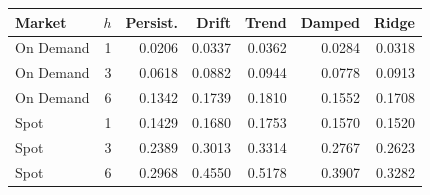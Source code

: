 \begin{tabular}{lrrrrrr}
\toprule
Market & $h$ & Persist. & Drift & Trend & Damped & Ridge \\
\midrule
On Demand & 1 & 0.0206 & 0.0337 & 0.0362 & 0.0284 & 0.0318 \\
On Demand & 3 & 0.0618 & 0.0882 & 0.0944 & 0.0778 & 0.0913 \\
On Demand & 6 & 0.1342 & 0.1739 & 0.1810 & 0.1552 & 0.1708 \\
Spot & 1 & 0.1429 & 0.1680 & 0.1753 & 0.1570 & 0.1520 \\
Spot & 3 & 0.2389 & 0.3013 & 0.3314 & 0.2767 & 0.2623 \\
Spot & 6 & 0.2968 & 0.4550 & 0.5178 & 0.3907 & 0.3282 \\
\bottomrule
\end{tabular}
